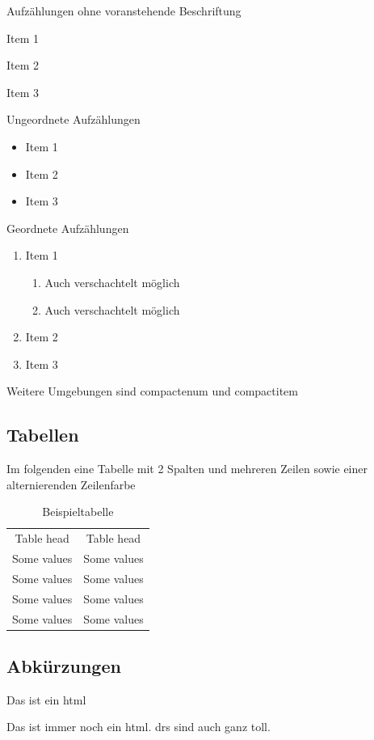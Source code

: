 \documentclass[\mainsize, a4paper, fleqn, xcolor=dvipsnames]{scrartcl}
\begin{document}
	Aufzählungen ohne voranstehende Beschriftung
	
	\begin{description}
		\item{Item 1}
		\item{Item 2}
		\item{Item 3}
	\end{description}
	
	Ungeordnete Aufzählungen
	
	\begin{itemize}
		\item{Item 1}
		\item{Item 2}
		\item{Item 3}
	\end{itemize}
	
	Geordnete Aufzählungen 
	
	\begin{enumerate} %
		\item{Item 1}
		\begin{enumerate}
			\item Auch verschachtelt möglich
			\item Auch verschachtelt möglich
		\end{enumerate}
		\item{Item 2}
		\item{Item 3}
	\end{enumerate}
	
	Weitere Umgebungen sind compactenum und compactitem
	
	\subsection{Tabellen}\label{subsec:tables}
	
	Im folgenden eine Tabelle mit 2 Spalten und mehreren Zeilen sowie einer alternierenden Zeilenfarbe
	
	\begin{table}[H]
		\centering
		\caption{Beispieltabelle}
		\label{tab:test}
		\begin{tabular}{|c|c|}
    		\rowcolor{gray!50}
    		\hline
    		Table head & Table head\\
    		Some values & Some values\\
    		Some values & Some values\\
    		Some values & Some values\\
    		Some values & Some values\\
    		\hline
  		\end{tabular}
	\end{table}
	
	\subsection{Abkürzungen}\label{subsec:abbrev}
	
	Das ist ein \ac{html}
	
	\newpage
	
	Das ist immer noch ein \ac{html}. \acp{dr} sind auch ganz toll.
	
\end{document}
